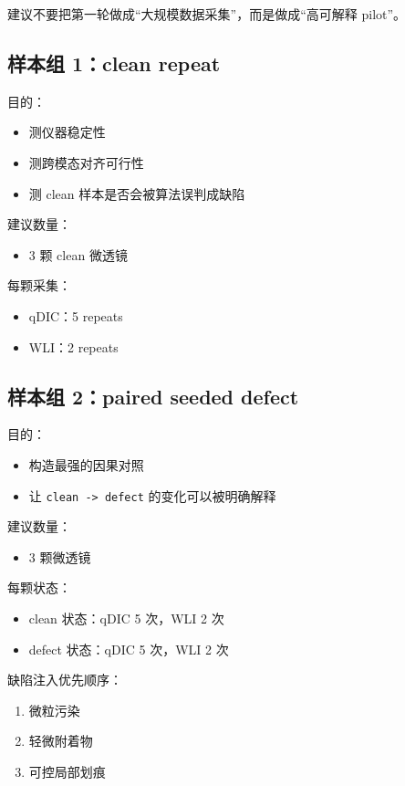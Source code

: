 \documentclass[UTF8,a4paper,11pt]{ctexart}
\newcommand{\Code}[1]{\texttt{#1}}
\begin{document}
建议不要把第一轮做成“大规模数据采集”，而是做成“高可解释 pilot”。

\subsection{样本组 1：clean repeat}

目的：
\begin{itemize}
  \item 测仪器稳定性
  \item 测跨模态对齐可行性
  \item 测 clean 样本是否会被算法误判成缺陷
\end{itemize}

建议数量：
\begin{itemize}
  \item 3 颗 clean 微透镜
\end{itemize}

每颗采集：
\begin{itemize}
  \item qDIC：5 repeats
  \item WLI：2 repeats
\end{itemize}

\subsection{样本组 2：paired seeded defect}

目的：
\begin{itemize}
  \item 构造最强的因果对照
  \item 让 \Code{clean -> defect} 的变化可以被明确解释
\end{itemize}

建议数量：
\begin{itemize}
  \item 3 颗微透镜
\end{itemize}

每颗状态：
\begin{itemize}
  \item clean 状态：qDIC 5 次，WLI 2 次
  \item defect 状态：qDIC 5 次，WLI 2 次
\end{itemize}

缺陷注入优先顺序：
\begin{enumerate}
  \item 微粒污染
  \item 轻微附着物
  \item 可控局部划痕
\end{enumerate}
\end{document}
